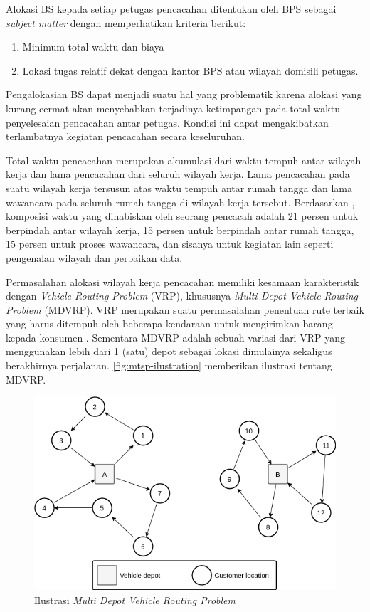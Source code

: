 Alokasi BS kepada setiap petugas pencacahan ditentukan oleh BPS sebagai \textit{subject matter} dengan memperhatikan kriteria berikut:
\begin{enumerate}
	\item Minimum total waktu dan biaya 
	\item Lokasi tugas relatif dekat dengan kantor BPS atau wilayah domisili petugas. 
\end{enumerate}
Pengalokasian BS dapat menjadi suatu hal yang problematik karena alokasi yang kurang cermat akan menyebabkan terjadinya ketimpangan pada total waktu penyelesaian pencacahan antar petugas. Kondisi ini dapat mengakibatkan terlambatnya kegiatan pencacahan secara keseluruhan.


Total waktu pencacahan merupakan akumulasi dari waktu tempuh antar wilayah kerja dan lama pencacahan dari seluruh wilayah kerja. Lama pencacahan pada suatu wilayah kerja  tersusun atas waktu tempuh antar rumah tangga dan lama wawancara pada seluruh rumah tangga di wilayah kerja tersebut. Berdasarkan \citep{sudman_time_1965}, komposisi waktu yang dihabiskan oleh seorang pencacah adalah 21 persen untuk berpindah antar wilayah kerja, 15 persen untuk berpindah antar rumah tangga, 15 persen untuk proses wawancara, dan sisanya untuk kegiatan lain seperti pengenalan wilayah dan perbaikan data.


Permasalahan alokasi wilayah kerja pencacahan memiliki kesamaan karakteristik dengan \textit{Vehicle Routing Problem} (VRP), khususnya \textit{Multi Depot Vehicle Routing Problem} (MDVRP). VRP merupakan suatu permasalahan penentuan rute terbaik yang harus ditempuh oleh beberapa kendaraan untuk mengirimkan barang kepada konsumen \citep{dantzig_truck_1959}. Sementara MDVRP adalah sebuah variasi dari VRP yang menggunakan lebih dari 1 (satu) depot sebagai lokasi dimulainya sekaligus berakhirnya perjalanan. \autoref{fig:mtsp-ilustration} memberikan ilustrasi tentang MDVRP. 


\begin{figure}[!]
    \centering
    \includegraphics[width=12cm]{Resources/Images/mdvrp-illustration}
    \caption{Ilustrasi \textit{Multi Depot Vehicle Routing Problem}}
    \label{fig:mtsp-ilustration}
\end{figure}


